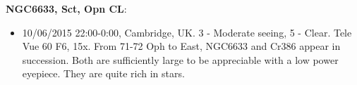 {\bf NGC6633, Sct, Opn CL}:
\begin{itemize}
\item 10/06/2015 22:00-0:00, Cambridge, UK. 3 - Moderate seeing, 5 - Clear. Tele Vue 60 F6, 15x. From 71-72 Oph to East, NGC6633 and Cr386 appear in succession. Both are sufficiently large to be appreciable with a low power eyepiece. They are quite rich in stars. 
\end{itemize}
